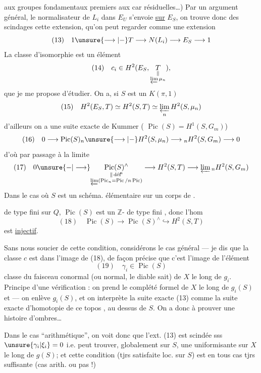 aux groupes fondamentaux premiers aux car résiduelles\dots) Par un argument général, le normalisateur de $L_i$ dans $E_U$ s'envoie \uline{sur} $E_S$, on trouve donc des scindages  cette extension, qu'on peut regarder comme une extension
\[
(13)\quad 1\unsure{\longrightarrow|-}T\longrightarrow N(L_i)\longrightarrow E_S\longrightarrow1
\]
La classe d'isomorphie est un élément 
\[
(14)\quad c_i\in H^2(E_S,\underset{\substack{\Vert\\\varprojlim\mu_n}}{T}),
\]
que je me propose d'étudier. On a, si $S$ est un $K(\pi,1)$
\[
(15)\quad H^2(E_S,T)\simeq H^2(S,T)\simeq\varprojlim_n H^2(S,\mu_n)
\]
d'ailleurs on a une suite exacte de Kummer ( $\operatorname{Pic}(S)=H^1(S,G_m)$)
\[
(16)\quad 0\longrightarrow\operatorname{Pic}(S)_n\unsure{\longrightarrow|-} H^2(S,\mu_n)\longrightarrow {}_nH^2(S,G_m)\longrightarrow0
\]
d'où par passage à la limite
\[
(17)\quad 0\unsure{-|\longrightarrow}
\underset{\substack{\Vert\,\text{déf}\!^{\mathrm n}\\\varprojlim(\operatorname{Pic}_n=\operatorname{Pic}/n\operatorname{Pic})}}{\operatorname{Pic}(S)^\wedge}
\longrightarrow H^2(S,T)\longrightarrow\varprojlim {}_nH^2(S,G_m)
\]
Dans le cas où $S$ est un schéma. élémentaire sur un corps de . 

de type fini sur $Q$, $\operatorname{Pic}(S)$ est un $\mathbb Z$- de type fini , donc l'hom
\[
(18)\quad \operatorname{Pic}(S)\longrightarrow\operatorname{Pic}(S)^\wedge\hookrightarrow H^2(S,T)
\]
est \uline{injectif}.

Sans nous soucier de cette condition,  considérons le cas général --- je dis que la classe  $c$  est dans l'image de (18), de façon précise que c'est l'image de l'élément
\[
(19)\quad \gamma_i\in\operatorname{Pic}(S)
\]
classe du faisceau conormal (ou normal, le diable sait) de $X$ le long de $g_i$. Principe d'une vérification : on prend le complété formel de $X$ le long de $g_i(S)$ et   --- on enlève $g_i(S)$, et on interprète la suite exacte (13) comme la suite exacte d'homotopie de ce  topos , au dessus de  $S$. On a donc à prouver une histoire d'ombres\dots
{}

Dans le cas ``arithmétique'', on voit donc que l'ext. (13) est scindée sss $\unsure{\gamma_i|\xi_i}=0$ i.e.  peut trouver, globalement sur $S$, une uniformisante sur $X$ le long de $g(S)$; et cette condition (tjrs satisfaite loc. sur $S$) est en tous cas tjrs suffisante (cas arith. ou pas !)

